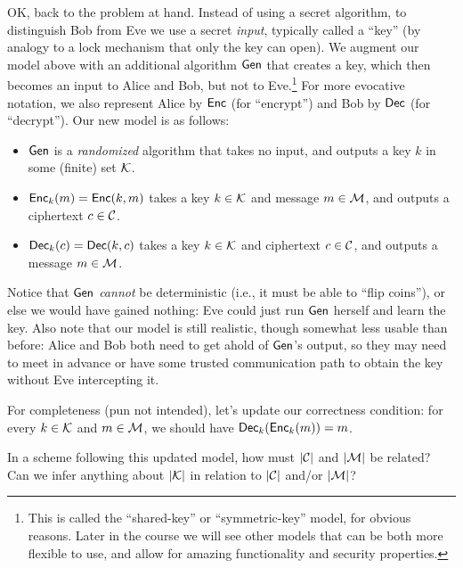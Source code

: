 \documentclass[11pt]{article}
\begin{document}
OK, back to the problem at hand.  Instead of using a secret algorithm,
to distinguish Bob from Eve we use a secret \emph{input}, typically
called a ``key'' (by analogy to a lock mechanism that only the key can
open).  We augment our model above with an additional algorithm
$\mathsf{Gen}$ that creates a key, which then becomes an input to Alice and
Bob, but not to Eve.\footnote{This is called the ``shared-key'' or
  ``symmetric-key'' model, for obvious reasons.  Later in the course
  we will see other models that can be both more flexible to use, and
  allow for amazing functionality and security properties.} For more
evocative notation, we also represent Alice by $\mathsf{Enc}$ (for
``encrypt'') and Bob by $\mathsf{Dec}$ (for ``decrypt'').  Our new model is
as follows:
\begin{itemize}
\item $\mathsf{Gen}$ is a \emph{randomized} algorithm that takes no input,
  and outputs a key $k$ in some (finite) set $\mathcal{K}$.
\item $\mathsf{Enc}_{k}(m) = \mathsf{Enc}(k,m)$ takes a key $k \in \mathcal{K}$
  and message $m \in \mathcal{M}$, and outputs a ciphertext $c \in
  \mathcal{C}$.
\item $\mathsf{Dec}_{k}(c) = \mathsf{Dec}(k,c)$ takes a key $k \in \mathcal{K}$
  and ciphertext $c \in \mathcal{C}$, and outputs a message $m \in
  \mathcal{M}$.
\end{itemize}
Notice that $\mathsf{Gen}$ \emph{cannot} be deterministic (i.e., it must be
able to ``flip coins''), or else we would have gained nothing: Eve
could just run $\mathsf{Gen}$ herself and learn the key.  Also note that
our model is still realistic, though somewhat less usable than before:
Alice and Bob both need to get ahold of $\mathsf{Gen}$'s output, so they
may need to meet in advance or have some trusted communication path to
obtain the key without Eve intercepting it.

For completeness (pun not intended), let's update our correctness
condition: for every $k \in \mathcal{K}$ and $m \in \mathcal{M}$, we
should have $\mathsf{Dec}_{k}(\mathsf{Enc}_{k}(m)) = m$.

\begin{question}
  In a scheme following this updated model, how must
  \(\lvert\mathcal{C}\rvert\) and \(\lvert\mathcal{M}\rvert\) be related? Can we infer
  anything about \(\lvert\mathcal{K}\rvert\) in relation to \(\lvert\mathcal{C}\rvert\)
  and/or \(\lvert\mathcal{M}\rvert\)?
\end{question}
\end{document}
